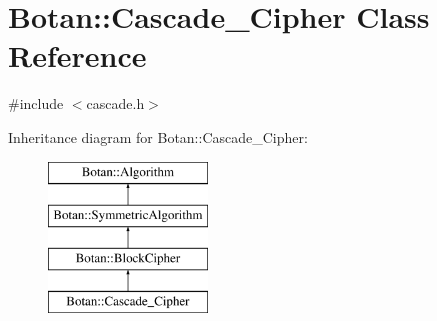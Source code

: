 \hypertarget{classBotan_1_1Cascade__Cipher}{\section{Botan\-:\-:Cascade\-\_\-\-Cipher Class Reference}
\label{classBotan_1_1Cascade__Cipher}
}


{\ttfamily \#include $<$cascade.\-h$>$}

Inheritance diagram for Botan\-:\-:Cascade\-\_\-\-Cipher\-:\begin{figure}[H]
\begin{center}
\leavevmode
\includegraphics[height=4.000000cm]{classBotan_1_1Cascade__Cipher}
\end{center}
\end{figure}

